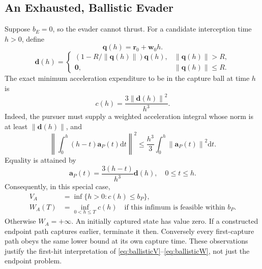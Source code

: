 \documentclass[journal,a4paper]{IEEEtran}
\newcommand{\norm}[1]{\left\|#1\right\|}
\newcommand{\dd}{\mathrm d}
\begin{document}
\subsection{An Exhausted, Ballistic Evader}
Suppose $b_E=0$, so the evader cannot thrust. For a candidate interception time $h>0$, define
\begin{equation}
 \mathbf q(h)=\mathbf r_0+\mathbf w_0h.
\end{equation}
\begin{equation}
 \mathbf d(h)=
 \begin{cases}
 (1-R/\norm{\mathbf q(h)})\mathbf q(h),&\norm{\mathbf q(h)}>R,\\
 \mathbf0,&\norm{\mathbf q(h)}\le R.
 \end{cases}
\end{equation}
The exact minimum acceleration expenditure to be in the capture ball at time $h$ is
\begin{equation}
 \boxed{c(h)=\frac{3\norm{\mathbf d(h)}^2}{h^3}.}
 \label{eq:ballisticcost}
\end{equation}
Indeed, the pursuer must supply a weighted acceleration integral whose norm is at least $\norm{\mathbf d(h)}$, and
\begin{equation}
 \norm{\int_0^h(h-t)\mathbf a_P(t)\dd t}^2
 \le\frac{h^3}{3}\int_0^h\norm{\mathbf a_P(t)}^2\dd t.
\end{equation}
Equality is attained by
\begin{equation}
 \boxed{\mathbf a_P(t)=\frac{3(h-t)}{h^3}\mathbf d(h),
                     \quad 0\le t\le h.}
 \label{eq:ballisticcontrol}
\end{equation}
Consequently, in this special case,
\begin{align}
 V_A&=\inf\{h>0:c(h)\le b_P\},\label{eq:ballisticV}\\
 W_A(T)&=\inf_{0<h\le T}c(h)
 \quad\text{if this infimum is feasible within }b_P.\label{eq:ballisticW}
\end{align}
Otherwise $W_A=+\infty$. An initially captured state has value zero. If a constructed endpoint path captures earlier, terminate it then. Conversely every first-capture path obeys the same lower bound at its own capture time. These observations justify the first-hit interpretation of \eqref{eq:ballisticV}--\eqref{eq:ballisticW}, not just the endpoint problem.
\end{document}
